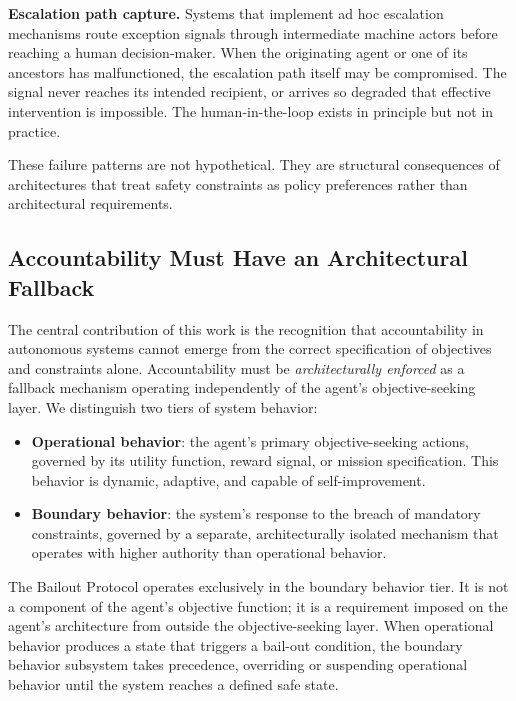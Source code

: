 \textbf{Escalation path capture.} Systems that implement ad hoc escalation mechanisms route exception signals through intermediate machine actors before reaching a human decision-maker. When the originating agent or one of its ancestors has malfunctioned, the escalation path itself may be compromised. The signal never reaches its intended recipient, or arrives so degraded that effective intervention is impossible. The human-in-the-loop exists in principle but not in practice.

These failure patterns are not hypothetical. They are structural consequences of architectures that treat safety constraints as policy preferences rather than architectural requirements.

\subsection{Accountability Must Have an Architectural Fallback}
\label{sec:core-insight}

The central contribution of this work is the recognition that accountability in autonomous systems cannot emerge from the correct specification of objectives and constraints alone. Accountability must be \textit{architecturally enforced} as a fallback mechanism operating independently of the agent's objective-seeking layer. We distinguish two tiers of system behavior:

\begin{itemize}
\item \textbf{Operational behavior}: the agent's primary objective-seeking actions, governed by its utility function, reward signal, or mission specification. This behavior is dynamic, adaptive, and capable of self-improvement.
\item \textbf{Boundary behavior}: the system's response to the breach of mandatory constraints, governed by a separate, architecturally isolated mechanism that operates with higher authority than operational behavior.
\end{itemize}

The Bailout Protocol operates exclusively in the boundary behavior tier. It is not a component of the agent's objective function; it is a requirement imposed on the agent's architecture from outside the objective-seeking layer. When operational behavior produces a state that triggers a bail-out condition, the boundary behavior subsystem takes precedence, overriding or suspending operational behavior until the system reaches a defined safe state.

